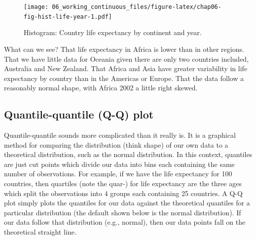 \documentclass[
  12pt,
  krantz2]{krantz}
\makeatletter
\newenvironment{Shaded}{\begin{snugshade}}{\end{snugshade}}
\newcommand{\CommentTok}[1]{\textcolor[rgb]{0.56,0.35,0.01}{\textit{#1}}}
\newcommand{\DataTypeTok}[1]{\textcolor[rgb]{0.13,0.29,0.53}{#1}}
\newcommand{\DecValTok}[1]{\textcolor[rgb]{0.00,0.00,0.81}{#1}}
\newcommand{\KeywordTok}[1]{\textcolor[rgb]{0.13,0.29,0.53}{\textbf{#1}}}
\newcommand{\NormalTok}[1]{#1}
\newcommand{\OperatorTok}[1]{\textcolor[rgb]{0.81,0.36,0.00}{\textbf{#1}}}
\newcommand{\StringTok}[1]{\textcolor[rgb]{0.31,0.60,0.02}{#1}}
\newenvironment{kframe}{%
\medskip{}
\setlength{\fboxsep}{.8em}
 \def\at@end@of@kframe{}%
 \ifinner\ifhmode%
  \def\at@end@of@kframe{\end{minipage}}%
  \begin{minipage}{\columnwidth}%
 \fi\fi%
 \def\FrameCommand##1{\hskip\@totalleftmargin \hskip-\fboxsep
 \colorbox{shadecolor}{##1}\hskip-\fboxsep
     \hskip-\linewidth \hskip-\@totalleftmargin \hskip\columnwidth}%
 \MakeFramed {\advance\hsize-\width
   \@totalleftmargin\z@ \linewidth\hsize
   \@setminipage}}%
 {\par\unskip\endMakeFramed%
 \at@end@of@kframe}
\renewenvironment{Shaded}{\begin{kframe}}{\end{kframe}}
\makeatother
\begin{document}
\begin{figure}
\centering
\texttt{[image: 06\_working\_continuous\_files/figure-latex/chap06-fig-hist-life-year-1.pdf]}
\caption{\label{fig:chap06-fig-hist-life-year}Histogram: Country life expectancy by continent and year.}
\end{figure}

What can we see?
That life expectancy in Africa is lower than in other regions.
That we have little data for Oceania given there are only two countries included, Australia and New Zealand.
That Africa and Asia have greater variability in life expectancy by country than in the Americas or Europe.
That the data follow a reasonably normal shape, with Africa 2002 a little right skewed.

\hypertarget{chap06-h3-qq-plot}{%
\subsection{Quantile-quantile (Q-Q) plot}\label{chap06-h3-qq-plot}}

Quantile-quantile sounds more complicated than it really is.
It is a graphical method for comparing the distribution (think shape) of our own data to a theoretical distribution, such as the normal distribution.
In this context, quantiles are just cut points which divide our data into bins each containing the same number of observations.
For example, if we have the life expectancy for 100 countries, then quartiles (note the quar-) for life expectancy are the three ages which split the observations into 4 groups each containing 25 countries.
A Q-Q plot simply plots the quantiles for our data against the theoretical quantiles for a particular distribution (the default shown below is the normal distribution).
If our data follow that distribution (e.g., normal), then our data points fall on the theoretical straight line.

\begin{Shaded}
\end{Shaded}
\end{document}
